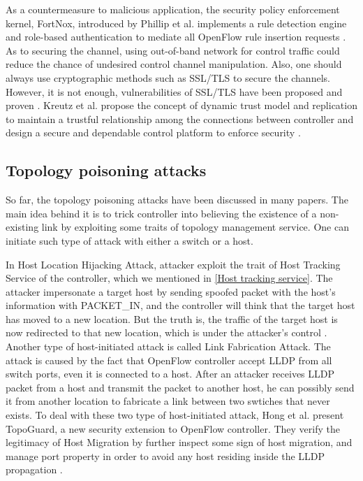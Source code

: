 As a countermeasure to malicious application, the security policy enforcement kernel, FortNox, introduced by Phillip et al. implements a rule detection engine and role-based authentication to mediate all OpenFlow rule insertion requests \cite{PSYFTG12}. As to securing the channel, using out-of-band network for control traffic could reduce the chance of undesired control channel manipulation. Also, one should always use cryptographic methods such as SSL/TLS to secure the channels. However, it is not enough, vulnerabilities of SSL/TLS have been proposed and proven \cite{HRKC12}. Kreutz et al. propose the concept of dynamic trust model and replication to maintain a trustful relationship among the connections between controller and design a secure and dependable control platform to enforce security \cite{KDFRV13}. 

\subsection{Topology poisoning attacks}
So far, the topology poisoning attacks have been discussed in many papers. The main idea behind it is to trick controller into believing the existence of a non-existing link by exploiting some traits of topology management service. One can initiate such type of attack with either a switch or a host.

In Host Location Hijacking Attack, attacker exploit the trait of Host Tracking Service of the controller, which we mentioned in \ref{Host tracking service}. The attacker impersonate a target host by sending spoofed packet with the host's information with PACKET\_IN, and the controller will think that the target host has moved to a new location. But the truth is, the traffic of the target host is now redirected to that new location, which is under the attacker's control \cite{HXWG15}. Another type of host-initiated attack is called Link Fabrication Attack. The attack is caused by the fact that OpenFlow controller accept LLDP from all switch ports, even it is connected to a host. After an attacker receives LLDP packet from a host and transmit the packet to another host, he can possibly send it from another location to fabricate a link between two swtiches that never exists. To deal with these two type of host-initiated attack, Hong et al. present TopoGuard, a new security extension to OpenFlow controller. They verify the legitimacy of Host Migration by further inspect some sign of host migration, and manage port property in order to avoid any host residing inside the LLDP propagation \cite{HXWG15}. 

